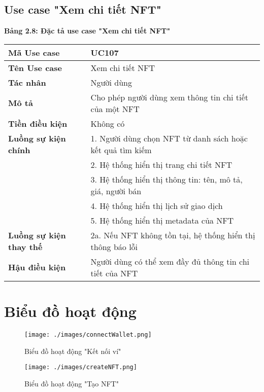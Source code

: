 \subsection{Use case "Xem chi tiết NFT"}
\textbf{Bảng 2.8: Đặc tả use case "Xem chi tiết NFT"}
\renewcommand{\arraystretch}{1.5}
\begin{tabular}{|l|p{10cm}|}
    \hline
    \rule{0pt}{3ex}\textbf{Mã Use case} & UC107 \\
    \hline
    \rule{0pt}{3ex}\textbf{Tên Use case} & Xem chi tiết NFT \\
    \hline
    \rule{0pt}{3ex}\textbf{Tác nhân} & Người dùng \\
    \hline
    \rule{0pt}{3ex}\textbf{Mô tả} & Cho phép người dùng xem thông tin chi tiết của một NFT \\
    \hline
    \rule{0pt}{3ex}\textbf{Tiền điều kiện} & Không có \\
    \hline
    \rule{0pt}{3ex}\textbf{Luồng sự kiện chính} & 1. Người dùng chọn NFT từ danh sách hoặc kết quả tìm kiếm \\
    & 2. Hệ thống hiển thị trang chi tiết NFT \\
    & 3. Hệ thống hiển thị thông tin: tên, mô tả, giá, người bán \\
    & 4. Hệ thống hiển thị lịch sử giao dịch \\
    & 5. Hệ thống hiển thị metadata của NFT \\
    \hline
    \rule{0pt}{3ex}\textbf{Luồng sự kiện thay thế} & 2a. Nếu NFT không tồn tại, hệ thống hiển thị thông báo lỗi \\
    \hline
    \rule{0pt}{3ex}\textbf{Hậu điều kiện} & Người dùng có thể xem đầy đủ thông tin chi tiết của NFT \\
    \hline
\end{tabular}

\section{Biểu đồ hoạt động}

\begin{figure}[H]
    \centering
    \texttt{[image: ./images/connectWallet.png]}
    \caption{Biểu đồ hoạt động "Kết nối ví"}
    \label{fig:ketnoivi}
\end{figure}

\begin{figure}[H]
    \centering
    \texttt{[image: ./images/createNFT.png]}
    \caption{Biểu đồ hoạt động "Tạo NFT"}
    \label{fig:taonft}
\end{figure}

